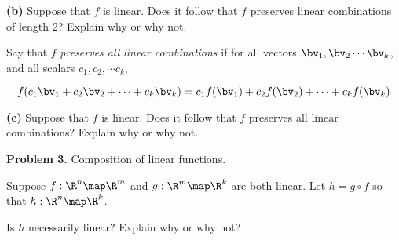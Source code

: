 \documentclass[oneside,12pt]{amsart}
\begin{document}
\bigskip
\bigskip
\bigskip
\bigskip
\bigskip
\bigskip

\textbf{(b)} Suppose that $f$ is linear. Does it follow that $f$ preserves
linear combinations of length 2? Explain why or why not.

\bigskip
\bigskip
\bigskip
\bigskip
\bigskip
\bigskip

Say that $f$ \emph{preserves all linear combinations} if
for all vectors $\bv_1,\bv_2 \cdots \bv_k$, and all scalars
$c_1, c_2, \cdots c_k$,

$$f(c_1 \bv_1 + c_2 \bv_2 + \cdots + c_k \bv_k)
= c_1 f(\bv_1) + c_2 f(\bv_2) + \cdots + c_k f(\bv_k)$$

\bigskip

\textbf{(c)} Suppose that $f$ is linear. Does it follow that $f$ preserves
all linear combinations? Explain why or why not.

\bigskip
\bigskip
\bigskip
\bigskip
\bigskip
\bigskip

\textbf{Problem 3.} Composition of linear functions.

\smallskip

Suppose $f:\R^n\map\R^m$ and $g:\R^m\map\R^k$ are both linear.
Let $h=g\circ f$ so that $h:\R^n\map\R^k$.

\smallskip

Is $h$ necessarily linear? Explain why or why not?
\end{document}
